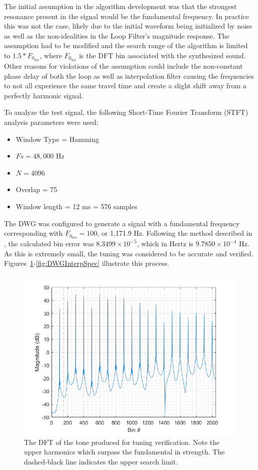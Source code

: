 \documentclass[../main.tex]{subfiles}
\begin{document}
The initial assumption in the algorithm development was that the strongest resonance present in the signal would be the fundamental frequency. In practice this was not the case, likely due to the initial waveform being initialized by noise as well as the non-idealities in the Loop Filter's magnitude response. The assumption had to be modified and the search range of the algorithm is limited to $1.5*F_{0_{bin}}$, where $F_{0_{bin}}$ is the DFT bin associated with the synthesized sound. Other reasons for violations of the assumption could include the non-constant phase delay of both the loop as well as interpolation filter causing the frequencies to not all experience the same travel time and create a slight shift away from a perfectly harmonic signal.

To analyze the test signal, the following Short-Time Fourier Transform (STFT) analysis parameters were used:
\begin{itemize}
    \item Window Type = Hamming
    \item $Fs = 48,000$ Hz
    \item $N = 4096$
    \item Overlap = 75%
    \item Window length = 12 ms = 576 samples
\end{itemize}

The DWG was configured to generate a signal with a fundamental frequency corresponding with $F_{0_{bin}} = 100$, or 1,171.9 Hz. Following the method described in , the calculated bin error was $8.3499 \times 10^{-5}$, which in Hertz is $9.7850 \times 10^{-4}$ Hz. As this is extremely small, the tuning was considered to be accurate and verified. Figures~\ref{fig:DWGInterpBins}-\ref{fig:DWGInterpSpec} illustrate this process.

\begin{figure}[h]
    \centering
    \includegraphics[scale=.65]{./images/plots/StringDWGInterpBins.png}
    \caption{The DFT of the tone produced for tuning verification. Note the upper harmonics which surpass the fundamental in strength. The dashed-black line indicates the upper search limit.}
    \label{fig:DWGInterpBins}
\end{figure}
\end{document}
